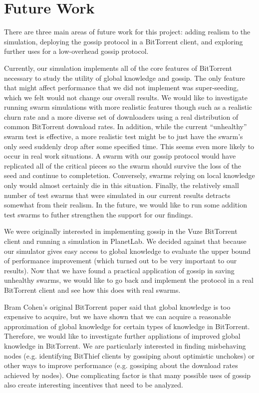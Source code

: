 \section{Future Work}

There are three main areas of future work for this project: adding realism 
to the simulation, deploying the gossip protocol in a BitTorrent client,
and exploring further uses for a low-overhead gossip protocol. 

Currently, our simulation implements all of the core features of
BitTorrent necessary to study the utility of global knowledge and
gossip. The only feature that might affect performance that we did not
implement was super-seeding, which we felt would not change our overall
results. We would like to investigate running swarm simulations with
more realistic features though such as a realistic churn rate and a more
diverse set of downloaders using a real distribution of common BitTorrent
download rates. In addition, while the current ``unhealthy'' swarm test is
effective, a more realistic test might be to just have the swarm's only
seed suddenly drop after some specified time. This seems even more likely to
occur in real work situations. A swarm with our gossip protocol would have
replicated all of the critical pieces so the swarm should survive the loss of
the seed and continue to completetion. Conversely, swarms relying on local 
knowledge only would almost certainly die in this situation. Finally, the
relatively small number of test swarms that were simulated in our current
results detracts somewhat from their realism. In the future, we would like
to run some addition test swarms to futher strengthen the support for our
findings.

We were originally interested in implementing gossip in the Vuze BitTorrent client
and running a simulation in PlanetLab. We decided against that because our simulator
gives easy access to global knowledge to evaluate the upper bound of performance improvement
(which turned out to be very important to our results). Now that we have found a practical
application of gossip in saving unhealthy swarms, we would like to go back and implement
the protocol in a real BitTorrent client and see how this does with real swarms.


Bram Cohen's original BitTorrent paper said that global knowledge is too expensive to acquire,
but we have shown that we can acquire a reasonable approximation of global knowledge
for certain types of knowledge in BitTorrent. Therefore, we would like to investigate
further appliations of improved global knowledge in BitTorrent. We are particularly interested in 
finding misbehaving nodes (e.g. identifying BitThief clients by gossiping about optimistic unchokes)
or other ways to improve performance (e.g. gossiping about the download rates achieved by nodes).
One complicating factor is that many possible uses of gossip also create interesting incentives
that need to be analyzed.

